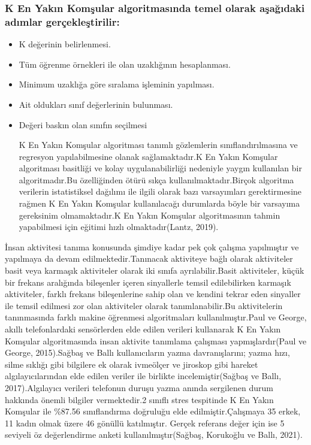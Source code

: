 \documentclass[12pt,twoside]{deuthesis}
\begin{document}
\hypertarget{k-en-yakux131n-komux15fular-algoritmasux131nda-temel-olarak-aux15faux11fux131daki-adux131mlar-geruxe7ekleux15ftirilir}{%
\subsubsection{K En Yakın Komşular algoritmasında temel olarak aşağıdaki adımlar gerçekleştirilir:}\label{k-en-yakux131n-komux15fular-algoritmasux131nda-temel-olarak-aux15faux11fux131daki-adux131mlar-geruxe7ekleux15ftirilir}}
\begin{itemize}
\item
  K değerinin belirlenmesi.
\item
  Tüm öğrenme örnekleri ile olan uzaklığının hesaplanması.
\item
  Minimum uzaklığa göre sıralama işleminin yapılması.
\item
  Ait oldukları sınıf değerlerinin bulunması.
\item
  Değeri baskın olan sınıfın seçilmesi

  K En Yakın Komşular algoritması tanımlı gözlemlerin sınıflandırılmasına ve regresyon yapılabilmesine olanak sağlamaktadır.K En Yakın Komşular algoritması basitliği ve kolay uygulanabilirliği nedeniyle yaygın kullanılan bir algoritmadır.Bu özelliğinden ötürü sıkça kullanılmaktadır.Birçok algoritma verilerin istatistiksel dağılımı ile ilgili olarak bazı varsayımları gerektirmesine rağmen K En Yakın Komşular kullanılacağı durumlarda böyle bir varsayıma gereksinim olmamaktadır.K En Yakın Komşular algoritmasının tahmin yapabilmesi için eğitimi hızlı olmaktadır(Lantz, 2019).
\end{itemize}
İnsan aktivitesi tanıma konusunda şimdiye kadar pek çok çalışma yapılmıştır ve yapılmaya da devam edilmektedir.Tanınacak aktiviteye bağlı olarak aktiviteler basit veya karmaşık aktiviteler olarak iki sınıfa ayrılabilir.Basit aktiviteler, küçük bir frekans aralığında bileşenler içeren sinyallerle temsil edilebilirken karmaşık aktiviteler, farklı frekans bileşenlerine sahip olan ve kendini tekrar eden sinyaller ile temsil edilmesi zor olan aktiviteler olarak tanımlanabilir.Bu aktivitelerin tanınmasında farklı makine öğrenmesi algoritmaları kullanılmıştır.Paul ve George, akıllı telefonlardaki sensörlerden elde edilen verileri kullanarak K En Yakın Komşular algoritmasında insan aktivite tanımlama çalışması yapmışlardır(Paul ve George, 2015).Sağbaş ve Ballı kullanıcıların yazma davranışlarını; yazma hızı, silme sıklığı gibi bilgilere ek olarak ivmeölçer ve jiroskop gibi hareket algılayıcılarından elde edilen veriler ile birlikte incelemiştir(Sağbaş ve Ballı, 2017).Algılayıcı verileri telefonun duruşu yazma anında sergilenen durum hakkında önemli bilgiler vermektedir.2 sınıflı stres tespitinde
K En Yakın Komşular ile \%87.56 sınıflandırma doğruluğu elde edilmiştir.Çalışmaya 35 erkek, 11 kadın olmak üzere 46 gönüllü katılmıştır. Gerçek referans değer için ise 5 seviyeli öz değerlendirme anketi kullanılmıştır(Sağbaş, Korukoğlu ve Ballı, 2021).
\end{document}
